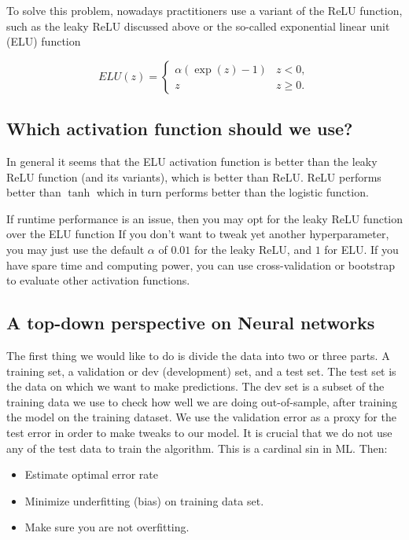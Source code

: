 \documentclass[%
oneside,                 %
final,                   %
10pt]{article}
\begin{document}
To solve this problem, nowadays practitioners use a  variant of the ReLU
function, such as the leaky ReLU discussed above or the so-called
exponential linear unit (ELU) function


\[
ELU(z) = \left\{\begin{array}{cc} \alpha\left( \exp{(z)}-1\right) & z < 0,\\  z & z \ge 0.\end{array}\right. 
\]


\subsection{Which activation function should we use?}

In general it seems that the ELU activation function is better than
the leaky ReLU function (and its variants), which is better than
ReLU. ReLU performs better than $\tanh$ which in turn performs better
than the logistic function. 

If runtime
performance is an issue, then you may opt for the  leaky ReLU function  over the 
ELU function If you don’t
want to tweak yet another hyperparameter, you may just use the default
$\alpha$ of $0.01$ for the leaky ReLU, and $1$ for ELU. If you have
spare time and computing power, you can use cross-validation or
bootstrap to evaluate other activation functions.



\subsection{A top-down perspective on Neural networks}


The first thing we would like to do is divide the data into two or three
parts. A training set, a validation or dev (development) set, and a
test set. The test set is the data on which we want to make
predictions. The dev set is a subset of the training data we use to
check how well we are doing out-of-sample, after training the model on
the training dataset. We use the validation error as a proxy for the
test error in order to make tweaks to our model. It is crucial that we
do not use any of the test data to train the algorithm. This is a
cardinal sin in ML. Then:


\begin{itemize}
\item Estimate optimal error rate

\item Minimize underfitting (bias) on training data set.

\item Make sure you are not overfitting.
\end{itemize}
\end{document}

